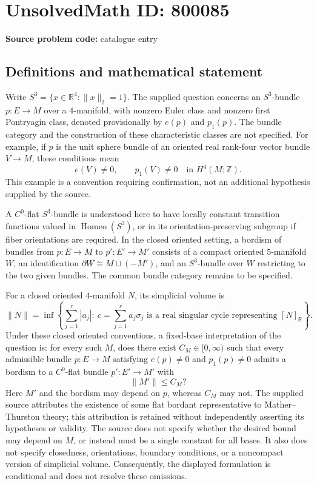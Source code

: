 \documentclass[11pt]{article}
\newcommand{\Z}{\mathbb{Z}}
\newcommand{\R}{\mathbb{R}}
\begin{document}
\section*{UnsolvedMath ID: 800085}
\textbf{Source problem code:} catalogue entry
\subsection{Definitions and mathematical statement}
Write \(S^3=\{x\in\R^4:\|x\|_2=1\}\). The supplied question concerns an \(S^3\)-bundle \(p:E\to M\) over a \(4\)-manifold, with nonzero Euler class and nonzero first Pontryagin class, denoted provisionally by \(e(p)\) and \(p_1(p)\). The bundle category and the construction of these characteristic classes are not specified. For example, if \(p\) is the unit sphere bundle of an oriented real rank-four vector bundle \(V\to M\), these conditions mean
\[
e(V)\ne0,\qquad p_1(V)\ne0\quad\text{in }H^4(M;\Z).
\]
This example is a convention requiring confirmation, not an additional hypothesis supplied by the source.

A \(C^0\)-flat \(S^3\)-bundle is understood here to have locally constant transition functions valued in \(\operatorname{Homeo}(S^3)\), or in its orientation-preserving subgroup if fiber orientations are required. In the closed oriented setting, a bordism of bundles from \(p:E\to M\) to \(p':E'\to M'\) consists of a compact oriented \(5\)-manifold \(W\), an identification \(\partial W\cong M\sqcup(-M')\), and an \(S^3\)-bundle over \(W\) restricting to the two given bundles. The common bundle category remains to be specified.

For a closed oriented \(4\)-manifold \(N\), its simplicial volume is
\[
\|N\|=\inf\left\{\sum_{j=1}^{r}|a_j|:\ c=\sum_{j=1}^{r}a_j\sigma_j\text{ is a real singular cycle representing }[N]_{\R}\right\}.
\]
Under these closed oriented conventions, a fixed-base interpretation of the question is: for every such \(M\), does there exist \(C_M\in[0,\infty)\) such that every admissible bundle \(p:E\to M\) satisfying \(e(p)\ne0\) and \(p_1(p)\ne0\) admits a bordism to a \(C^0\)-flat bundle \(p':E'\to M'\) with
\[
\|M'\|\le C_M?
\]
Here \(M'\) and the bordism may depend on \(p\), whereas \(C_M\) may not. The supplied source attributes the existence of some flat bordant representative to Mather--Thurston theory; this attribution is retained without independently asserting its hypotheses or validity. The source does not specify whether the desired bound may depend on \(M\), or instead must be a single constant for all bases. It also does not specify closedness, orientations, boundary conditions, or a noncompact version of simplicial volume. Consequently, the displayed formulation is conditional and does not resolve these omissions.
\end{document}
